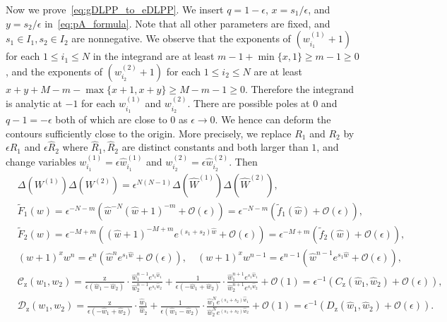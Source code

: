 \documentclass{article}
\numberwithin{equation}{section}
\newcommand{\bigO}{\mathcal{O}}
\newcommand{\rz}{\mathrm{z}}
\begin{document}
Now we prove~\eqref{eq:gDLPP_to_eDLPP}. We insert $q=1-\epsilon$, $x=s_1/\epsilon$, and $y=s_2/\epsilon$ in~\eqref{eq:pA_formula}. Note that all other parameters are fixed, and $s_1\in I_1,s_2\in I_2$ are nonnegative. We observe that the exponents of $(w_{i_1}^{(1)}+1)$ for each $1\le i_1\le N$ in the integrand are at least $m-1 +\min\{x,1\}\ge m-1\ge 0$, and the exponents of $(w_{i_2}^{(2)}+1)$ for each $1\le i_2\le N$ are at least $x+y+M-m-\max\{x+1,x+y\}\ge M-m-1\ge 0$. Therefore the integrand is analytic at $-1$ for each $w_{i_1}^{(1)}$ and $w_{i_2}^{(2)}$. There are possible poles at $0$ and $q-1=-\epsilon$ both of which are close to $0$ as $\epsilon\to 0$. We hence can deform the contours sufficiently close to the origin. More precisely, we replace $R_1$ and $R_2$ by $\epsilon \hat R_1$ and $\epsilon \hat R_2$ where $\hat R_1,\hat R_2$ are distinct constants and both larger than $1$, and change variables $w_{i_1}^{(1)} =\epsilon \hat w_{i_1}^{(1)}$ and $w_{i_2}^{(2)} =\epsilon \hat w_{i_2}^{(2)}$. Then
\begin{equation}
	\label{eq:2021_12_29_01}
	\begin{split}
	&\Delta\left(W^{(1)}\right)\Delta\left(W^{(2)}\right) = \epsilon^{N(N-1)} \Delta\left(\hat W^{(1)}\right)\Delta\left(\hat W^{(2)}\right),\\
	&\tilde F_1(w) = \epsilon^{-N-m}(\hat w^{-N} (\hat w+1)^{-m}+\bigO(\epsilon))
	              =\epsilon^{-N-m} (\tilde f_1(\hat w)+\bigO(\epsilon)),\\
	&\tilde F_2(w) = \epsilon^{-M+m} ((\hat w +1)^{-M+m} e^{(s_1+s_2)\hat w}+\bigO(\epsilon))
	              =\epsilon^{-M+m} (\tilde f_2(\hat w)+\bigO(\epsilon)),\\
	& \left(w+1\right)^x w^n = 
	             \epsilon^n (\hat w^n e^{s_1\hat w}+\bigO(\epsilon)),
	  \quad \left(w+1\right)^x w^{n-1} =
	             \epsilon^{n-1} (\hat w^{n-1} e^{s_1\hat w}+\bigO(\epsilon)),\\	
	&\mathcal{C}_\rz(w_1,w_2)= 
	       \frac{\rz}{\epsilon(\hat w_1-\hat w_2)}\cdot     
	       \frac{\hat w_1^{n-1}e^{s_1\hat w_1}}{\hat w_2^{n-1}e^{s_1\hat w_2}}
	      +\frac{1}{\epsilon(-\hat w_1+ \hat w_2)}\cdot 
	       \frac{\hat w_1^{n+1}e^{s_1 \hat w_1}}{\hat w_2^{n+1} e^{s_1\hat w_2}}+\bigO(1)
	       =\epsilon^{-1}(C_\rz(\hat w_1,\hat w_2)+\bigO(\epsilon)),\\
	&\mathcal{D}_{\rz}(w_1,w_2)= 
	      \frac{\rz}{\epsilon(-\hat w_1+\hat w_2)}\cdot     
	      \frac{\hat w_1 }{\hat w_2}
         +\frac{1}{\epsilon(\hat w_1- \hat w_2)}\cdot 
	      \frac{\hat w_1^{N}e^{(s_1+s_2)\hat w_1}}
	           {\hat w_2^{N} e^{(s_1+s_2)\hat w_2}}+\bigO(1)
	    =\epsilon^{-1}(D_\rz(\hat w_1,\hat w_2)+\bigO(\epsilon)).
	\end{split}
\end{equation}
\end{document}
